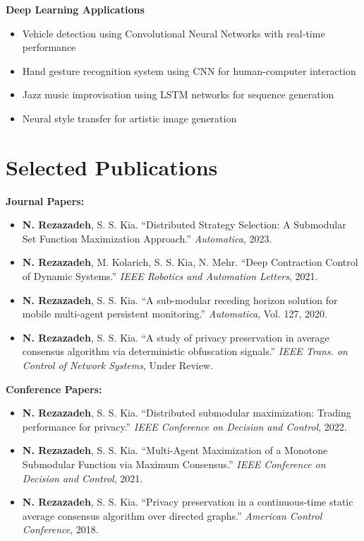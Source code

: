 \documentclass[11pt,letterpaper]{article}
\begin{document}
\textbf{Deep Learning Applications}
\begin{itemize}[leftmargin=*, itemsep=0pt, parsep=2pt]
    \item Vehicle detection using Convolutional Neural Networks with real-time performance
    \item Hand gesture recognition system using CNN for human-computer interaction
    \item Jazz music improvisation using LSTM networks for sequence generation
    \item Neural style transfer for artistic image generation
\end{itemize}

\section*{Selected Publications}

\textbf{Journal Papers:}
\begin{itemize}[leftmargin=*, itemsep=0pt, parsep=2pt]
    \item \textbf{N. Rezazadeh}, S. S. Kia. ``Distributed Strategy Selection: A Submodular Set Function Maximization Approach.'' \textit{Automatica}, 2023.
    \item \textbf{N. Rezazadeh}, M. Kolarich, S. S. Kia, N. Mehr. ``Deep Contraction Control of Dynamic Systems.'' \textit{IEEE Robotics and Automation Letters}, 2021.
    \item \textbf{N. Rezazadeh}, S. S. Kia. ``A sub-modular receding horizon solution for mobile multi-agent persistent monitoring.'' \textit{Automatica}, Vol. 127, 2020.
    \item \textbf{N. Rezazadeh}, S. S. Kia. ``A study of privacy preservation in average consensus algorithm via deterministic obfuscation signals.'' \textit{IEEE Trans. on Control of Network Systems}, Under Review.
\end{itemize}

\textbf{Conference Papers:}
\begin{itemize}[leftmargin=*, itemsep=0pt, parsep=2pt]
    \item \textbf{N. Rezazadeh}, S. S. Kia. ``Distributed submodular maximization: Trading performance for privacy.'' \textit{IEEE Conference on Decision and Control}, 2022.
    \item \textbf{N. Rezazadeh}, S. S. Kia. ``Multi-Agent Maximization of a Monotone Submodular Function via Maximum Consensus.'' \textit{IEEE Conference on Decision and Control}, 2021.
    \item \textbf{N. Rezazadeh}, S. S. Kia. ``Privacy preservation in a continuous-time static average consensus algorithm over directed graphs.'' \textit{American Control Conference}, 2018.
\end{itemize}
\end{document}
